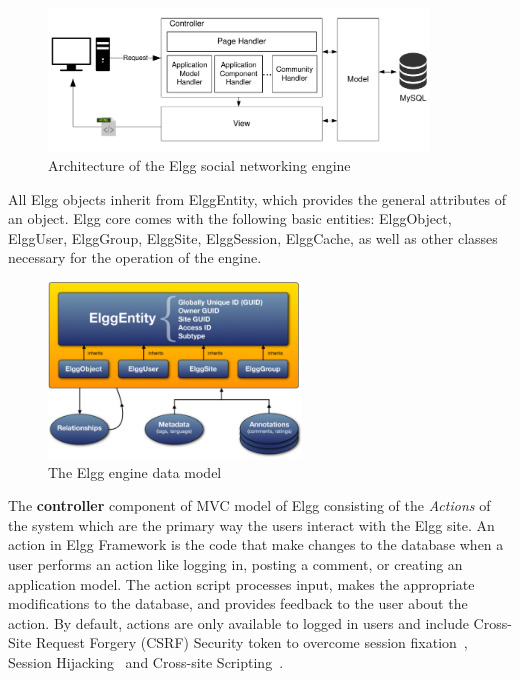 \begin{figure}[h]
	\centering
	\includegraphics[width=0.9\textwidth,natwidth=200,natheight=150]{./fig/elgg_architecture.pdf}
	\caption{Architecture of the Elgg social networking engine}
	\label{fig:elgg_architecture}
\end{figure}

All Elgg objects inherit from ElggEntity, which provides the general attributes of an object. Elgg core comes with the following basic entities: ElggObject, ElggUser, ElggGroup, ElggSite, ElggSession, ElggCache, as well as other classes necessary for the operation of the engine.

\begin{figure}[h]
	\centering
	\includegraphics[width=0.6\textwidth,natwidth=200,natheight=150]{./fig/elgg_data_model.png}
	\caption{The Elgg engine data model}
	\label{fig:elgg_entities}
\end{figure}

The {\bf controller} component of MVC model of Elgg consisting of the \emph{Actions} of the system which are the primary way the users interact with the Elgg site. An action in Elgg Framework is the code that make changes to the database when a user performs an action like logging in, posting a comment, or creating an application model. The action script processes input, makes the appropriate modifications to the database, and provides feedback to the user about the action. By default, actions are only available to logged in users and include Cross-Site Request Forgery (CSRF) Security token to overcome session fixation~\cite{kolvsek2002session}, Session Hijacking~\cite{burgersposter} and Cross-site Scripting~\cite{thamescomparing}.

